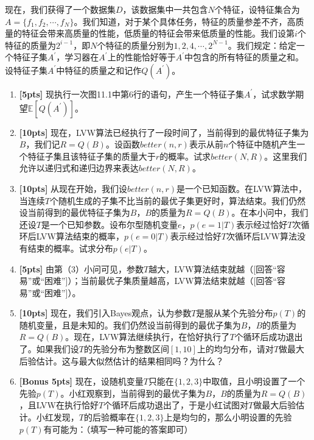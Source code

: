 \documentclass[a4paper,UTF8]{article}
\numberwithin{equation}{section}
\begin{document}
现在，我们获得了一个数据集$D$，该数据集中一共包含$N$个特征，设特征集合为$A=\{f_1,f_2,\cdots,f_N\}$。我们知道，对于某个具体任务，特征的质量参差不齐，高质量的特征会带来高质量的性能，低质量的特征会带来低质量的性能。我们设第$i$个特征的质量为$2^{i-1}$，即$N$个特征的质量分别为$1,2,4,\cdots,2^{N-1}$。我们规定：给定一个特征子集$A^\prime$，学习器在$A^\prime$上的性能恰好等于$A^\prime$中包含的所有特征的质量之和。设特征子集$A^\prime$中特征的质量之和记作$Q(A^\prime)$。

\begin{enumerate}[(1)]
\item \textbf{[5pts]} 现执行一次图11.1中第$6$行的语句，产生一个特征子集$A^\prime$，试求数学期望$\mathbb{E}[Q(A^\prime)]$。

\item \textbf{[10pts]} 现在，LVW算法已经执行了一段时间了，当前得到的最优特征子集为$B$，我们记$R=Q(B)$。设函数$better(n,r)$表示从前$n$个特征中随机产生一个特征子集且该特征子集的质量大于$r$的概率。试求$better(N,R)$。这里我们允许以递归式和递归边界来表达$better(N,R)$。
    
\item \textbf{[10pts]} 从现在开始，我们设$better(n,r)$是一个已知函数。在LVW算法中，当连续$T$个随机生成的子集不比当前的最优子集更好时，算法结束。我们仍然设当前得到的最优特征子集为$B$，$B$的质量为$R=Q(B)$。在本小问中，我们还设$T$是一个已知参数。设布尔型随机变量$e$，$p(e=1|T)$表示经过恰好$T$次循环后LVW算法结束的概率，$p(e=0|T)$表示经过恰好$T$次循环后LVW算法没有结束的概率。试求分布$p(e|T)$。

\item \textbf{[5pts]} 由第（3）小问可见，参数$T$越大，LVW算法结束就越（[回答“容易”或“困难”]）；当前最优子集质量越高，LVW算法结束就越（[回答“容易”或“困难”]）。

\item \textbf{[10pts]} 现在，我们引入Bayes观点，认为参数$T$是服从某个先验分布$p(T)$的随机变量，且是未知的。我们仍然设当前得到的最优子集为$B$，$B$的质量为$R=Q(B)$。现在，LVW算法继续执行，在恰好执行了$T$个循环后成功退出了。如果我们设$T$的先验分布为整数区间$[1, 10]$上的均匀分布，请对$T$做最大后验估计。这与最大似然估计的结果相同吗？为什么？

\item \textbf{[Bonus 5pts]} 现在，设随机变量$T$只能在$\{1,2,3\}$中取值，且小明设置了一个先验$p(T)$。小红观察到，当前得到的最优子集为$B$，$B$的质量为$R=Q(B)$，且LVW在执行恰好$T$个循环后成功退出了，于是小红试图对$T$做最大后验估计。小红发现，$T$的后验概率在$\{1,2,3\}$上是均匀的，那么小明设置的先验$p(T)$有可能为：（填写一种可能的答案即可）

\end{enumerate}
\end{document}
